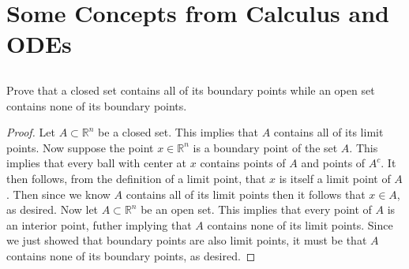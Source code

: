 \documentclass[11pt]{article}
\begin{document}
\pagestyle{fancy}
\fancyhead{}
\tableofcontents
\newpage
\section{Some Concepts from Calculus and ODEs}
\subsection{}
Prove that a closed set contains all of its boundary points while an open set contains none of its boundary points.
\begin{proof}
Let $A \subset \mathbb{R}^n$ be a closed set. This implies that $A$ contains all
of its limit points. Now suppose the point $x \in \mathbb{R}^n$ is a boundary
point of the set $A$. This implies that every ball with center at $x$ contains
points
of $A$ and points of $A^c$. It then follows, from the definition of a limit point,
that $x$ is itself a limit point of $A$. Then since we know $A$ contains all
of its limit points then it follows that $x \in A$, as desired. \newline
\indent Now let $A \subset \mathbb{R}^n$ be an open set. This implies that every
point of $A$ is an interior point, futher implying that $A$ contains none of its
limit points. Since we just showed that boundary points are also limit points,
it must be that $A$ contains none of its boundary points, as desired.
\end{proof}
\end{document}
